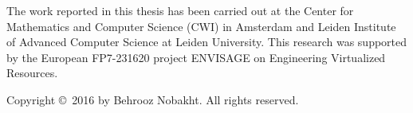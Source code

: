 \begin{titlepage}
%
\noindent
The work reported in this thesis has been carried out at the Center for Mathematics and Computer Science (CWI) in Amsterdam and Leiden Institute of Advanced Computer Science at Leiden University.
This research was supported by the European FP7-231620 project ENVISAGE on Engineering Virtualized Resources.
\par\vspace {1cm}

%

%
\noindent%
Copyright \copyright\ 2016 by Behrooz Nobakht. All rights reserved. \\ [2ex] %



	\thesisDate \\

\end{titlepage}


